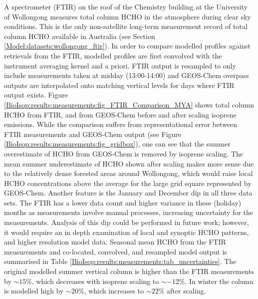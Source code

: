     A spectrometer (FTIR) on the roof of the Chemistry building at the University of Wollongong measures total column HCHO in the atmosphere during clear sky conditions.
    This is the only non-satellite long-term measurement record of total column HCHO available in Australia (see Section \ref{Model:datasets:wollongong_ftir}).
    In order to compare modelled profiles against retrievals from the FTIR, modelled profiles are first convolved with the instrument averaging kernel and a priori. %
    FTIR output is resampled to only include measurements taken at midday (13:00-14:00) and GEOS-Chem overpass outputs are interpolated onto matching vertical levels for days where FTIR output exists.
    Figure \ref{BioIsop:results:measurements:fig_FTIR_Comparison_MYA} shows total column HCHO from FTIR, and from GEOS-Chem before and after scaling isoprene emissions.
    While the comparison suffers from representational error between FTIR measurements and GEOS-Chem output (see Figure \ref{BioIsop:results:measurements:fig_gridbox}), one can see that the summer overestimate of HCHO from GEOS-Chem is removed by isoprene scaling.
    The mean summer underestimate of HCHO shown after scaling makes more sense due to the relatively dense forested areas around Wollongong, which would raise local HCHO concentrations above the average for the large grid square represented by GEOS-Chem.
    Another feature is the January and December dip in all three data sets.
    The FTIR has a lower data count and higher variance in these (holiday) months as measurements involve manual processes, increasing uncertainty for the measurements.
    Analysis of this dip could be performed in future work; however, it would require an in depth examination of local and synoptic HCHO patterns, and higher resolution model data.
    Seasonal mean HCHO from the FTIR measurements and co-located, convolved, and resampled model output is summarised in Table \ref{BioIsop:results:measurements:tab_uncertainties}.
    The original modelled summer vertical column is higher than the FTIR measurements by $\sim{15}\%$, which decreases with isoprene scaling to $\sim{-12}\%$.
    In winter the column is modelled high by $\sim{20}\%$, which increases to $\sim{22}\%$ after scaling.
    
